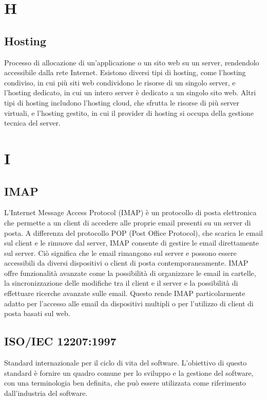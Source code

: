 \documentclass[12pt]{article}
\begin{document}
	\section{H}
		\subsection{Hosting}
		Processo di allocazione di un'applicazione o un sito web su un server, rendendolo accessibile dalla rete Internet. Esistono diversi tipi di hosting, come l'hosting condiviso, in cui più siti web condividono le risorse di un singolo server, e l'hosting dedicato, in cui un intero server è dedicato a un singolo sito web. Altri tipi di hosting includono l'hosting cloud, che sfrutta le risorse di più server virtuali, e l'hosting gestito, in cui il provider di hosting si occupa della gestione tecnica del server.
		
	\clearpage
	\section{I}
		\subsection{IMAP}
		L'Internet Message Access Protocol (IMAP) è un protocollo di posta elettronica che permette a un client di accedere alle proprie email presenti su un server di posta. A differenza del protocollo POP (Post Office Protocol), che scarica le email sul client e le rimuove dal server, IMAP consente di gestire le email direttamente sul server. Ciò significa che le email rimangono sul server e possono essere accessibili da diversi dispositivi o client di posta contemporaneamente. IMAP offre funzionalità avanzate come la possibilità di organizzare le email in cartelle, la sincronizzazione delle modifiche tra il client e il server e la possibilità di effettuare ricerche avanzate sulle email. Questo rende IMAP particolarmente adatto per l'accesso alle email da dispositivi multipli o per l'utilizzo di client di posta basati sul web.
		\subsection{ISO/IEC 12207:1997}
		Standard internazionale per il ciclo di vita del software. L'obiettivo di questo standard è fornire un quadro comune per lo sviluppo e la gestione del software, con una terminologia ben definita, che può essere utilizzata come riferimento dall'industria del software.
\end{document}

